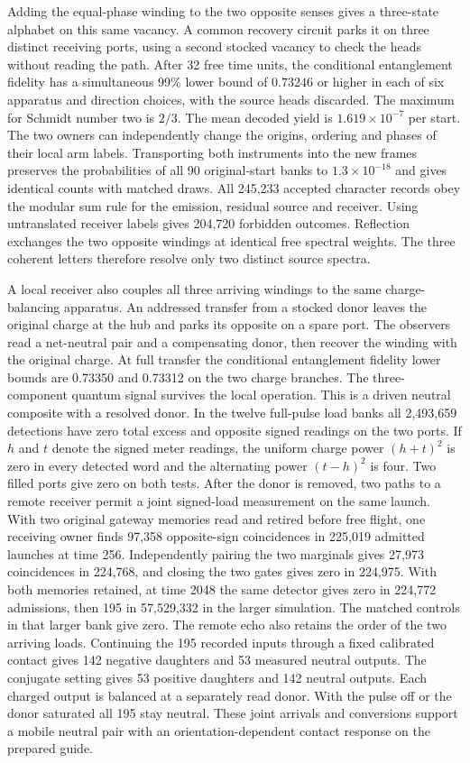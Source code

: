 Adding the equal-phase winding to the two opposite senses gives a
three-state alphabet on this same vacancy. A common recovery circuit
parks it on three distinct receiving ports, using a second stocked
vacancy to check the heads without reading the path. After 32 free time
units, the conditional entanglement fidelity has a simultaneous 99\% lower
bound of $0.73246$ or higher in each of six apparatus and direction
choices, with the source heads discarded. The maximum for Schmidt number
two is $2/3$. The mean decoded yield is $1.619\times10^{-7}$ per start.
The two owners can independently change the origins, ordering and phases
of their local arm labels. Transporting both instruments into the new
frames preserves the probabilities of all 90 original-start banks to
$1.3\times10^{-18}$ and gives identical counts with matched draws. All
245,233 accepted character records obey the modular sum rule for the
emission, residual source and receiver. Using untranslated receiver labels
gives 204,720 forbidden outcomes. Reflection exchanges the two opposite
windings at identical free spectral weights. The three coherent letters
therefore resolve only two distinct source spectra.

A local receiver also couples all three arriving windings to the same
charge-balancing apparatus. An addressed transfer from a stocked donor
leaves the original charge at the hub and parks its opposite on a spare
port. The observers read a net-neutral pair and a compensating donor,
then recover the winding with the original charge. At full transfer the
conditional entanglement fidelity lower bounds are 0.73350 and 0.73312
on the two charge branches. The three-component quantum signal survives
the local operation. This is a driven neutral composite with a resolved
donor. In the twelve full-pulse load banks all 2,493,659 detections
have zero total excess and opposite signed readings on the two ports.
If $h$ and $t$ denote the signed meter readings, the uniform charge
power $(h+t)^2$ is zero in every detected word and the alternating
power $(t-h)^2$ is four. Two filled ports give zero on both tests.
After the donor is removed, two paths to a remote receiver permit a
joint signed-load measurement on the same launch. With two original
gateway memories read and retired before free flight, one receiving
owner finds 97,358 opposite-sign coincidences in 225,019 admitted
launches at time 256. Independently pairing the two marginals gives
27,973 coincidences in 224,768, and closing the two gates gives zero
in 224,975. With both memories retained, at time 2048 the same detector
gives zero in 224,772 admissions, then 195 in 57,529,332 in the larger
simulation. The matched controls in that larger bank give zero.
The remote echo also retains the order of the two arriving loads.
Continuing the 195 recorded inputs through a fixed calibrated contact
gives 142 negative daughters and 53 measured neutral outputs. The
conjugate setting gives 53 positive daughters and 142 neutral outputs. Each charged output is balanced at a separately read donor.
With the pulse off or the donor saturated all 195 stay neutral.
These joint arrivals and conversions support a mobile neutral pair
with an orientation-dependent contact response on the prepared guide.

